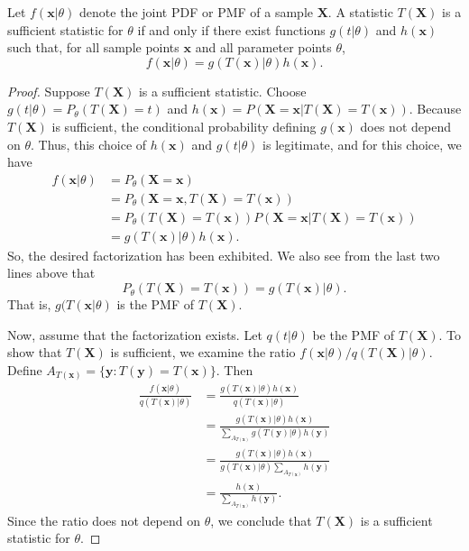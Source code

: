 \begin{theorem}
Let $f(\mathbf{x}|\theta)$ denote the joint PDF or PMF of a sample $\mathbf{X}$.
A statistic $T(\mathbf{X})$ is a sufficient statistic for $\theta$ if and only if there exist functions $g(t|\theta)$ and $h(\mathbf{x})$ such that, for all sample points $\mathbf{x}$ and all parameter points $\theta$,
\begin{equation*}
f(\mathbf{x}|\theta) = g(T(\mathbf{x})|\theta) h(\mathbf{x}) .
\end{equation*}
\end{theorem}
\begin{proof}
Suppose $T(\mathbf{X})$ is a sufficient statistic.
Choose $g(t|\theta) = P_{\theta} (T(\mathbf{X}) = t)$ and $h(\mathbf{x}) = P(\mathbf{X} = \mathbf{x} | T(\mathbf{X}) = T(\mathbf{x}))$.
Because $T(\mathbf{X})$ is sufficient, the conditional probability defining $g(\mathbf{x})$ does not depend on $\theta$.
Thus, this choice of $h(\mathbf{x})$ and $g(t|\theta)$ is legitimate, and for this choice, we have
\begin{equation*}
\begin{split}
f(\mathbf{x}|\theta) &= P_{\theta} (\mathbf{X} = \mathbf{x}) \\
&= P_{\theta} (\mathbf{X} = \mathbf{x}, T(\mathbf{X}) = T(\mathbf{x})) \\
&= P_{\theta} (T(\mathbf{X}) = T(\mathbf{x}))
P (\mathbf{X} = \mathbf{x} | T(\mathbf{X}) = T(\mathbf{x})) \\
&= g(T(\mathbf{x})|\theta) h(\mathbf{x}) .
\end{split}
\end{equation*}
So, the desired factorization has been exhibited.
We also see from the last two lines above that
\begin{equation*}
P_{\theta} (T(\mathbf{X}) = T(\mathbf{x}))
= g(T(\mathbf{x})|\theta) .
\end{equation*}
That is, $g(T(\mathbf{x}|\theta)$ is the PMF of $T(\mathbf{X})$.

Now, assume that the factorization exists.
Let $q(t|\theta)$ be the PMF of $T(\mathbf{X})$.
To show that $T(\mathbf{X})$ is sufficient, we examine the ratio $f(\mathbf{x}|\theta)/q(T(\mathbf{X})|\theta)$.
Define $A_{T(\mathbf{x})} = \{ \mathbf{y} : T(\mathbf{y}) = T(\mathbf{x}) \}$.
Then
\begin{equation*}
\begin{split}
\frac{ f(\mathbf{x}|\theta) }{ q(T(\mathbf{x})|\theta) }
&= \frac{ g(T(\mathbf{x})|\theta) h(\mathbf{x}) }{ q(T(\mathbf{x})|\theta) } \\
&= \frac{ g(T(\mathbf{x})|\theta) h(\mathbf{x}) }{ \sum_{A_{T(\mathbf{x})}} g(T(\mathbf{y})|\theta) h(\mathbf{y}) } \\
&= \frac{ g(T(\mathbf{x})|\theta) h(\mathbf{x}) }{ g(T(\mathbf{x})|\theta) \sum_{A_{T(\mathbf{x})}} h(\mathbf{y}) } \\
&= \frac{ h(\mathbf{x}) }{ \sum_{A_{T(\mathbf{x})}} h(\mathbf{y}) } .
\end{split}
\end{equation*}
Since the ratio does not depend on $\theta$, we conclude that $T(\mathbf{X})$ is a sufficient statistic for $\theta$.
\end{proof}


